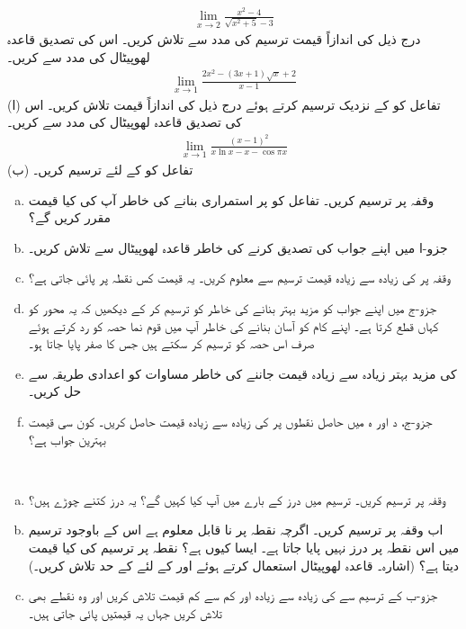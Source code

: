 \begin{align*}
\lim_{x\to2}\frac{x^2-4}{\sqrt{x^2+5}-3}
\end{align*} 
درج ذیل کی اندازاً قیمت ترسیم کی مدد سے تلاش کریں۔ اس کی تصدیق قاعدہ لھوپیٹال کی مدد سے کریں۔
\begin{align*}
\lim_{x\to1}\frac{2x^2-(3x+1)\sqrt{x}+2}{x-1}
\end{align*} 
(ا) تفاعل    کو  کے نزدیک ترسیم کرتے ہوئے درج ذیل کی اندازاً قیمت تلاش کریں۔ اس کی تصدیق قاعدہ لھوپیٹال کی مدد سے کریں۔
\begin{align*}
\lim_{x\to1}\frac{(x-1)^2}{x\ln x-x-\cos \pi x}
\end{align*} 
(ب) تفاعل  کو  کے لئے ترسیم کریں۔
\\
\begin{enumerate}[a.]
\item
وقفہ  پر  ترسیم کریں۔ تفاعل  کو  پر استمراری بنانے کی خاطر آپ  کی کیا قیمت مقرر کریں گے؟ 
\item
جزو-ا میں اپنے جواب کی تصدیق کرنے کی خاطر قاعدہ لھوپیٹال سے  تلاش کریں۔
\item
وقفہ  پر  کی زیادہ سے زیادہ قیمت ترسیم سے معلوم کریں۔ یہ قیمت کس نقطہ پر پائی جاتی ہے؟
\item
جزو-ج میں اپنے جواب کو مزید بہتر بنانے کی خاطر  کو ترسیم کر کے دیکھیں کہ یہ محور  کو کہاں قطع کرتا ہے۔ اپنے کام کو آسان بنانے کی خاطر آپ  میں قوم نما حصہ کو رد کرتے ہوئے صرف اس حصہ کو ترسیم کر سکتے ہیں جس کا صفر پایا جاتا ہو۔
\item
{} کی مزید بہتر زیادہ سے زیادہ قیمت جاننے کی خاطر مساوات  کو اعدادی طریقہ سے حل کریں۔
\item
جزو-ج، د اور ہ میں حاصل نقطوں پر  کی زیادہ سے زیادہ قیمت  حاصل کریں۔ کون سی قیمت بہترین جواب ہے؟
\end{enumerate}
\\
\begin{enumerate}[a.]
\item
وقفہ  پر  ترسیم کریں۔ ترسیم میں درز کے بارے میں آپ کیا کہیں گے؟ یہ درز کتنے چوڑے ہیں؟
\item
اب وقفہ  پر  ترسیم کریں۔ اگرچہ نقطہ  پر  نا قابل معلوم ہے اس کے باوجود ترسیم میں اس نقطہ پر درز نہیں پایا جاتا ہے۔ ایسا کیوں ہے؟ نقطہ  پر ترسیم  کی کیا قیمت دیتا ہے؟ (اشارہ۔ قاعدہ لھوپیٹال استعمال کرتے ہوئے  اور  کے لئے  کے حد تلاش کریں۔)
\item
جزو-ب کے ترسیم سے  کی زیادہ سے زیادہ اور کم سے کم قیمت تلاش کریں اور وہ نقطے بھی تلاش کریں جہاں یہ قیمتیں پائی جاتی ہیں۔
\end{enumerate}
